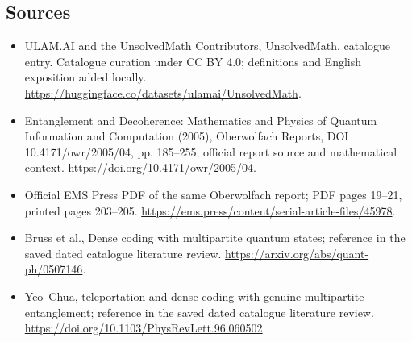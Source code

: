 \documentclass[11pt]{article}
\begin{document}
\subsection{Sources}
\begin{itemize}
\item[\hypertarget{source:statement:1}{S1}] ULAM.AI and the UnsolvedMath Contributors, UnsolvedMath, catalogue entry. Catalogue curation under CC BY 4.0; definitions and English exposition added locally.
\url{https://huggingface.co/datasets/ulamai/UnsolvedMath}.
\item[\hypertarget{source:statement:2}{S2}] Entanglement and Decoherence: Mathematics and Physics of Quantum Information and Computation (2005), Oberwolfach Reports, DOI 10.4171/owr/2005/04, pp. 185--255; official report source and mathematical context.
\url{https://doi.org/10.4171/owr/2005/04}.
\item[\hypertarget{source:statement:3}{S3}] Official EMS Press PDF of the same Oberwolfach report; PDF pages 19--21, printed pages 203--205.
\url{https://ems.press/content/serial-article-files/45978}.
\item[\hypertarget{source:statement:4}{S4}] Bruss et al., Dense coding with multipartite quantum states; reference in the saved dated catalogue literature review.
\url{https://arxiv.org/abs/quant-ph/0507146}.
\item[\hypertarget{source:statement:5}{S5}] Yeo--Chua, teleportation and dense coding with genuine multipartite entanglement; reference in the saved dated catalogue literature review.
\url{https://doi.org/10.1103/PhysRevLett.96.060502}.
\end{itemize}
\label{end:statement}
\end{document}
